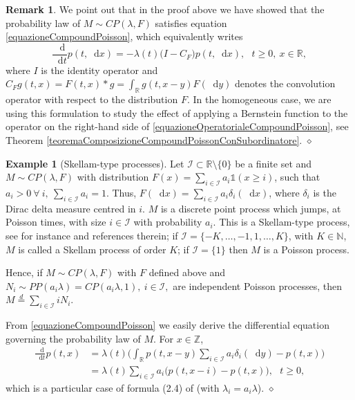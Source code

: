 \documentclass[12pt, twoside, english, headsepline]{article}
\newcommand*\dif{\mathop{}\!\mathrm{d}}  %
\theoremstyle{definition} %
\newtheorem{example}{Example}[section]
\newtheorem{remark}{Remark}[section] %
\numberwithin{equation}{section} %
\begin{document}
\begin{remark}
	We point out that in the proof above we have showed that the probability law of $M\sim CP(\lambda, F)$ satisfies equation \eqref{equazioneCompoundPoisson}, which equivalently writes
	\begin{equation}\label{equazioneOperatorialeCompoundPoisson}
		\frac{\dif}{\dif t}p(t, \dif x) = -\lambda(t) \big( I- C_F \big) p (t, \dif x),\ \ \ t\ge0,\ x\in\mathbb{R},
	\end{equation}
	where $I$ is the identity operator and $C_F g(t, x) = F(t,x)\ast g = \int_\mathbb{R} g(t, x-y) F(\dif y)$ denotes the convolution operator with respect to the distribution $F$. In the homogeneous case, we are using this formulation to study the effect of applying a Bernstein function to the operator on the right-hand side of \eqref{equazioneOperatorialeCompoundPoisson}, see Theorem \ref{teoremaComposizioneCompoundPoissonConSubordinatore}. \hfill$\diamond$
\end{remark}

\begin{example}[Skellam-type processes]\label{esempioSkellam}
	Let $\mathcal{I}\subset \mathbb{R}\setminus\{0\}$ be a finite set and $M\sim CP(\lambda, F)$ with distribution $F(x) = \sum_{i\in \mathcal{I}} a_i \mathds{1}(x\ge i)$, such that $a_i>0\ \forall\ i,\ \sum_{i\in\mathcal{I}}a_i = 1$. Thus, $F(\dif x)= \sum_{i\in\mathcal{I}} a_i \delta_i(\dif x)$, where $\delta_i$ is the Dirac delta measure centred in $i$. $M$ is a discrete point process which jumps, at Poisson times, with size $i\in \mathcal{I}$ with probability $a_i$. This is a Skellam-type process, see for instance \cite{CO202} and references therein; if $\mathcal{I} = \{-K,\dots,-1,1,\dots,K\}$, with $K\in\mathbb{N}$, $M$ is called a Skellam process of order $K$; if $\mathcal{I}=\{1\}$ then $M$ is a Poisson process. 
	
	Hence, if $M\sim CP(\lambda, F)$ with $F$ defined above and  $N_i\sim PP(a_i\lambda) = CP(a_i\lambda, 1), \ i\in\mathcal{I},$ are independent Poisson processes, then  $M\stackrel{d}{=} \sum_{i \in\mathcal{I} } i N_i.$
	
	From \eqref{equazioneCompoundPoisson} we easily derive the differential equation governing the probability law of $M$. For $x\in\mathbb{Z}$,
	\begin{align}
			\frac{\dif}{\dif t}p(t, x) &= \lambda(t) \Bigg( \int_{\mathbb{R}} p(t, x-y)\sum_{i\in \mathcal{I}} a_i\delta_i(\dif y) - p(t, x)\Bigg)\nonumber\\
			& =\lambda(t)\sum_{i\in\mathcal{I}}a_i \big(p(t, x-i) -p(t,x)\big),\ \ \ t\ge0,
	\end{align}
	which is a particular case of formula (2.4) of \cite{CO202} (with $\lambda_i = a_i\lambda$). \hfill$\diamond$
\end{example}
\end{document}
